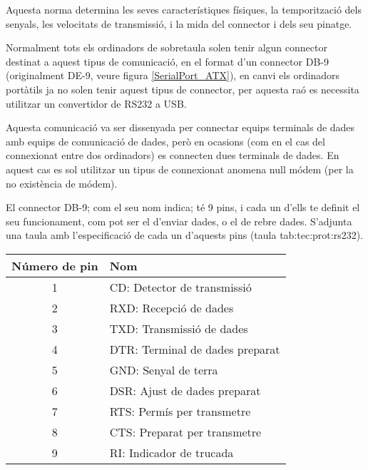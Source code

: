 Aquesta norma determina les seves característiques físiques, la temporització dels senyals, les velocitats de transmissió, i la mida del connector i dels seu pinatge.


Normalment tots els ordinadors de sobretaula solen tenir algun connector destinat a aquest tipus de comunicació, en el format d'un connector DB-9 (originalment DE-9, veure figura \ref{SerialPort_ATX}), en canvi els ordinadors portàtils ja no solen tenir aquest tipus de connector, per aquesta raó es necessita utilitzar un convertidor de RS232 a USB.

Aquesta comunicació va ser dissenyada per connectar equips terminals de dades amb equips de comunicació de dades, però en ocasions (com en el cas del connexionat entre dos ordinadors) es connecten dues terminals de dades. En aquest cas es sol utilitzar un tipus de connexionat anomena null módem (per la no existència de módem).

El connector DB-9; com el seu nom indica; té 9 pins, i cada un d'ells te definit el seu funcionament, com pot ser el d'enviar dades, o el de rebre dades. S'adjunta una taula amb l'especificació de cada un d'aquests pins (taula tab:tec:prot:rs232).

\begin{table}[ht!]
	\begin{center}
	\begin{tabular}{ | c | l | }
\hline
Número de pin	&Nom\\
\hline
1	&CD: Detector de transmissió\\
\hline
2	&RXD: Recepció de dades\\
\hline
3	&TXD: Transmissió de dades\\
\hline
4	&DTR: Terminal de dades preparat\\
\hline
5	&GND: Senyal de terra\\
\hline
6	&DSR: Ajust de dades preparat\\
\hline
7	&RTS: Permís per transmetre\\
\hline
8	&CTS: Preparat per transmetre\\
\hline
9	&RI: Indicador de trucada\\
\hline
	\end{tabular}
	\end {center}
	\label{tab:tec:prot:rs232}
\end{table}


